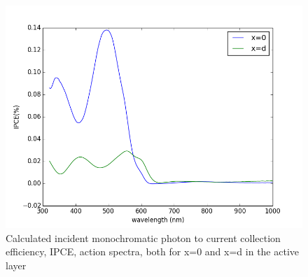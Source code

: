 \documentclass{article}
\begin{document}
\begin{figure}[h!]
  \centering
    \includegraphics[width=1\textwidth]{IPCE}
  \caption{Calculated incident monochromatic photon to current collection
  efficiency, IPCE, action spectra, both for x=0 and x=d in the active layer }
  \label{IPCE}
\end{figure}

{}

\end{document}
